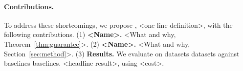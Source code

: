 \paragraph{Contributions.} To address these shortcomings, we propose \sys{}, <one-line definition>, with the following contributions.
(1) \textbf{<Name>.} <What and why, Theorem~\ref{thm:guarantee}>.
(2) \textbf{<Name>.} <What and why, Section~\ref{sec:method}>.
(3) \textbf{Results.} We evaluate \sys{} on \num{datasets} datasets against \num{baselines} baselines. \sys{} <headline result>, using <cost>.
